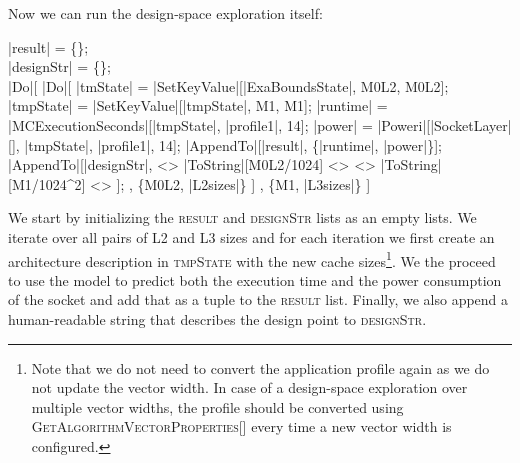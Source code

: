 Now we can run the design-space exploration itself:
\begin{mma}
\In |result| = \{\}; \\
\In |designStr| = \{\}; \\
\In |Do|[ \linebreak
 \quad |Do|[\linebreak
  \quad\quad |tmState| = |SetKeyValue|[|ExaBoundsState|, M0L2, M0L2]; \linebreak
  \quad\quad |tmpState| = |SetKeyValue|[|tmpState|, M1, M1]; \linebreak
  \quad\quad |runtime| = |MCExecutionSeconds|[|tmpState|, |profile1|, 14]; \linebreak
  \quad\quad |power| = |Poweri|[|SocketLayer|[], |tmpState|, |profile1|, 14]; \linebreak
  \quad\quad |AppendTo|[|result|, \{|runtime|, |power|\}]; \linebreak
  \quad\quad |AppendTo|[|designStr|,  <> |ToString|[M0L2/1024] \linebreak\quad\quad <>  <> |ToString|[M1/1024^2] <> ]; \linebreak
  \quad\quad , \{M0L2, |L2sizes|\} \linebreak
  \quad] \linebreak
 , \{M1, |L3sizes|\} \linebreak
 ] \\
\end{mma}
We start by initializing the \textsc{result} and \textsc{designStr} lists as an empty lists. We iterate over all pairs of L2 and L3 sizes and for each iteration we first create an architecture description in \textsc{tmpState} with the new cache sizes\footnote{Note that we do not need to convert the application profile again as we do not update the vector width. In case of a design-space exploration over multiple vector widths, the profile should be converted using \textsc{GetAlgorithmVectorProperties[]} every time a new vector width is configured.}. We the proceed to use the model to predict both the execution time and the power consumption of the socket and add that as a tuple to the \textsc{result} list. Finally, we also append a human-readable string that describes the design point to \textsc{designStr}.

